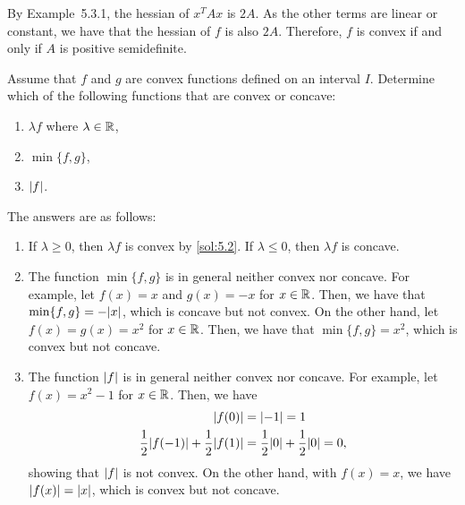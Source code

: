 \begin{solution}
  By Example~5.3.1, the hessian of $x^T A x$ is $2A$.
  As the other terms are linear or constant, we have that the hessian of $f$ is also $2A$.
  Therefore, $f$ is convex if and only if $A$ is positive semidefinite.
\end{solution}

\begin{exercise}
  Assume that $f$ and $g$ are convex functions defined on an interval $I$.
  Determine which of the following functions that are convex or concave:
  \begin{enumerate}[label = (\emph{\roman*})]
    \item $\lambda f$ where $\lambda \in \mathbb{R}$,
    \item $\min\{f, g\}$,
    \item $\lvert f\rvert$.
  \end{enumerate}
\end{exercise}

\begin{solution}
  The answers are as follows:
  \begin{enumerate}[label = (\emph{\roman*})]
    \item If $\lambda \geq 0$, then $\lambda f$ is convex by \cref{sol:5.2}.
      If $\lambda \leq 0$, then $\lambda f$ is concave.

    \item The function $\min\{f, g\}$ is in general neither convex nor concave.
      For example, let $f(x) = x$ and $g(x) = -x$ for $x \in \mathbb{R}$.
      Then, we have that $\min\{f, g\} = -\lvert x\rvert$, which is concave but not convex.
      On the other hand, let $f(x) = g(x) = x^2$ for $x \in \mathbb{R}$.
      Then, we have that $\min\{f, g\} = x^2$, which is convex but not concave.

    \item The function $\lvert f\rvert$ is in general neither convex nor concave.
      For example, let $f(x) = x^2 - 1$ for $x \in \mathbb{R}$.
      Then, we have
      \begin{align*}
        \lvert f(0)\rvert &= \lvert-1\rvert = 1 \\
        \frac{1}{2} \lvert f(-1)\rvert + \frac{1}{2} \lvert f(1)\rvert &= \frac{1}{2} \lvert0\rvert + \frac{1}{2} \lvert0\rvert = 0,
      \end{align*}
      showing that $\lvert f\rvert$ is not convex.
      On the other hand, with $f(x) = x$, we have $\lvert f(x)\rvert = \lvert x\rvert$, which is convex but not concave.
  \end{enumerate}
\end{solution}

